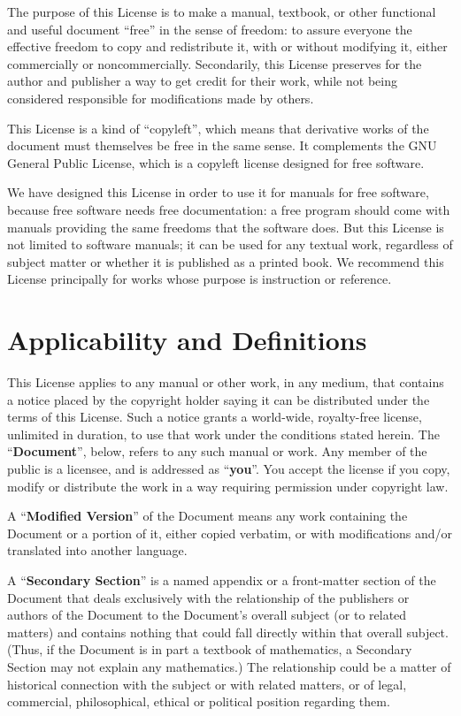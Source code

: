\documentclass[12pt,a4paper,openany]{book}
\begin{document}
The purpose of this License is to make a manual, textbook, or other
functional and useful document “free” in the sense of freedom: to assure
everyone the effective freedom to copy and redistribute it, with or without
modifying it, either commercially or noncommercially.  Secondarily, this
License preserves for the author and publisher a way to get credit for
their work, while not being considered responsible for modifications made
by others.

This License is a kind of “copyleft”, which means that derivative works of
the document must themselves be free in the same sense.  It complements the
GNU General Public License, which is a copyleft license designed for free
software.

We have designed this License in order to use it for manuals for free
software, because free software needs free documentation: a free program
should come with manuals providing the same freedoms that the software
does.  But this License is not limited to software manuals; it can be used
for any textual work, regardless of subject matter or whether it is
published as a printed book.  We recommend this License principally for
works whose purpose is instruction or reference.

\section{Applicability and Definitions}
\label{FDL:sec1}

This License applies to any manual or other work, in any medium, that
contains a notice placed by the copyright holder saying it can be
distributed under the terms of this License.  Such a notice grants a
world-wide, royalty-free license, unlimited in duration, to use that work
under the conditions stated herein.  The “\textbf{Document}”, below,
refers to any such manual or work.  Any member of the public is a licensee,
and is addressed as “\textbf{you}”.  You accept the license if you copy,
modify or distribute the work in a way requiring permission under copyright
law.

A “\textbf{Modified Version}” of the Document means any work containing the
Document or a portion of it, either copied verbatim, or with modifications
and/or translated into another language.

A “\textbf{Secondary Section}” is a named appendix or a front-matter
section of the Document that deals exclusively with the relationship of the
publishers or authors of the Document to the Document’s overall subject (or
to related matters) and contains nothing that could fall directly within
that overall subject.  (Thus, if the Document is in part a textbook of
mathematics, a Secondary Section may not explain any mathematics.)  The
relationship could be a matter of historical connection with the subject or
with related matters, or of legal, commercial, philosophical, ethical or
political position regarding them.
\end{document}

